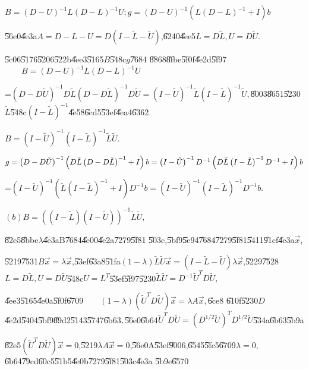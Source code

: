 \documentclass{article}
\begin{document}
$B=\left( D-U\right) ^{-1}L\left( D-L\right) ^{-1}U;g=\left( D-U\right)
^{-1}\left( L\left( D-L\right) ^{-1}+I\right) b$

\U{56e0}\U{4e3a}$A=D-L-U=D(I-\widetilde{L}-\widetilde{U})$,\U{6240}\U{4ee5}$%
L=D\tilde{L},U=D\tilde{U}.$

\U{5c06}\U{5176}\U{5206}\U{522b}\U{4ee3}\U{5165}$B$\U{548c}$g$\U{7684}%
\U{8868}\U{8fbe}\U{5f0f}\U{4e2d}\U{5f97}$\qquad B=\left( D-U\right)
^{-1}L\left( D-L\right) ^{-1}U$

=$\left( D-D\tilde{U}\right) ^{-1}D\tilde{L}\left( D-D\tilde{L}\right) ^{-1}D%
\tilde{U}=\left( I-\tilde{U}\right) ^{-1}\tilde{L}\left( I-\tilde{L}\right)
^{-1}\tilde{U},$\U{8003}\U{8651}\U{5230}$\tilde{L}$\U{548c}$\left( I-\tilde{L%
}\right) ^{-1}$\U{4e58}\U{6cd5}\U{53ef}\U{4ea4}\U{6362}

$B=\left( I-\tilde{U}\right) ^{-1}\left( I-\tilde{L}\right) ^{-1}\tilde{L}%
\tilde{U}.$

$g=\left( D-D\tilde{U}\right) ^{-1}\left( D\tilde{L}\left( D-D\tilde{L}%
\right) ^{-1}+I\right) b=\left( I-\tilde{U}\right) ^{-1}D^{-1}\left( D\tilde{%
L}\left( I-\tilde{L}\right) ^{-1}D^{-1}+I\right) b$

=$\left( I-\tilde{U}\right) ^{-1}\left( \tilde{L}\left( I-\tilde{L}\right)
^{-1}+I\right) D^{-1}b=\left( I-\tilde{U}\right) ^{-1}\left( I-\tilde{L}%
\right) ^{-1}D^{-1}b.$

$\left( b\right) B=\left( \left( I-\tilde{L}\right) \left( I-\tilde{U}%
\right) \right) ^{-1}\tilde{L}\tilde{U},$

\U{82e5}\U{8bbe}$\lambda $\U{4e3a}B\U{7684}\U{4e00}\U{4e2a}\U{7279}\U{5f81}%
\U{503c},\U{5bf9}\U{5e94}\U{7684}\U{7279}\U{5f81}\U{5411}\U{91cf}\U{4e3a}$%
\vec{x}$,

\U{5219}\U{7531}$B\vec{x}=\lambda \vec{x}$,\U{53ef}\U{63a8}\U{51fa}$\left(
1-\lambda \right) \tilde{L}\tilde{U}\vec{x}=\left( I-\tilde{L}-\tilde{U}%
\right) \lambda \vec{x}$,\U{5229}\U{7528}$L=D\tilde{L},U=D\tilde{U}$\U{548c}$%
U=L^{T}$\U{53ef}\U{5f97}\U{5230}$\tilde{L}\tilde{U}=D^{-1}\tilde{U}^{T}D%
\tilde{U},$

\U{4ee3}\U{5165}\U{4e0a}\U{5f0f}\U{6709}$\qquad \left( 1-\lambda \right)
\left( \tilde{U}^{T}D\tilde{U}\right) \vec{x}=\lambda A\vec{x},$\U{6ce8}%
\U{610f}\U{5230}$D$\U{4e2d}\U{5404}\U{5bf9}\U{89d2}\U{5143}\U{5747}\U{6b63}$%
, $\U{56e0}\U{6b64}$\tilde{U}^{T}D\tilde{U}=\left( D^{1/2}\tilde{U}\right)
^{T}D^{1/2}\tilde{U}$\U{534a}\U{6b63}\U{5b9a}

\U{82e5}$\left( \tilde{U}^{T}D\tilde{U}\right) \vec{x}=0$,\U{5219}$\lambda A%
\vec{x}=0$,\U{56e0}A\U{53ef}\U{9006},\U{6545}\U{5fc5}\U{6709}$\lambda =0,$%
\U{6b64}\U{79cd}\U{60c5}\U{51b5}\U{4e0b}\U{7279}\U{5f81}\U{503c}\U{4e3a}%
\U{5b9e}\U{6570}
\end{document}
